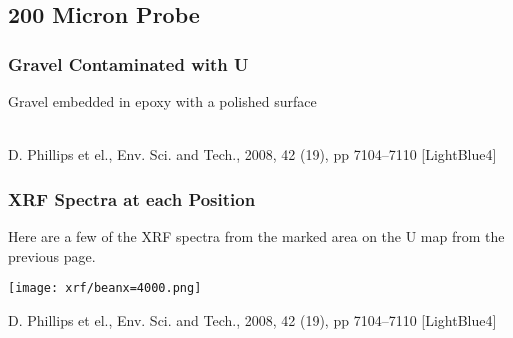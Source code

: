 \documentclass[10pt, xcolor=x11names, compress]{beamer}
\begin{document}
\subsection[200 $\mu$m]{200 Micron Probe}

\begin{frame}
  \frametitle{Gravel Contaminated with U}

  \begin{center}
    Gravel embedded in epoxy with a polished surface\\[1ex]

    \\[1ex]

  \end{center}

  \begin{bottomnote}[0.5][19.75]
    D. Phillips et el., Env. Sci. and Tech., 2008, 42 (19), pp
    7104–7110
    [LightBlue4]
  \end{bottomnote}
\end{frame}
\begin{frame}
  \frametitle{XRF Spectra at each Position}

  Here are a few of the XRF spectra from the marked area on the U map
  from the previous page.
  \begin{center}
    \texttt{[image: xrf/beanx=4000.png]}
  \end{center}
  \begin{bottomnote}[0.5][19.75]
    D. Phillips et el., Env. Sci. and Tech., 2008, 42 (19), pp
    7104–7110
    [LightBlue4]
  \end{bottomnote}
\end{frame}
\end{document}
